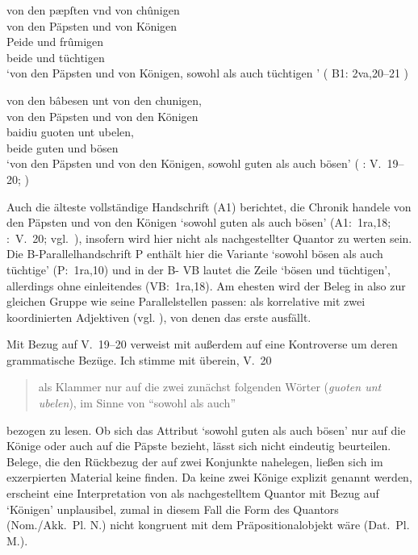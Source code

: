 \begin{exe}
\ex \begin{xlist}
	\ex \label{ex:kcexcl1}
		\gll von den pæpſten vnd von chûnigen \\
			von den Päpsten und von Königen \\
	\sn \gll Peide und frûmigen \\
			beide und tüchtigen \\
		\trans `von den Päpsten und von Königen, sowohl als auch tüchtigen
			'
			(%
				B1: 2va,20--21%
			)

	\ex \label{ex:kcexcl1_schroeder}
		\gll von den bâbesen unt von den chunigen, \\
			von den Päpsten und von den Königen \\
	\sn \gll baidiu guoten unt ubelen, \\
			beide guten und bösen \\
		\trans `von den Päpsten und von den Königen, sowohl guten als auch
			bösen'
			(%
				\KC: V.~19--20;
				\cite[79]{schroeder1895}%
			)
\end{xlist}
\end{exe}

Auch die älteste vollständige Handschrift (A1) berichtet, die Chronik handele
von den Päpsten und von den Königen  `sowohl guten
als auch bösen' (A1:~1ra,18; \KC:~V.~20; vgl.~\cite[79]{schroeder1895}),
insofern wird  hier nicht als nachgestellter Quantor zu werten
sein. Die B-\allowbreak{}Pa\-ral\-lel\-hand\-schrift P enthält hier die
Variante  `sowohl bösen als auch
tüchtige' (P:~1ra,10) und in der B- VB
lautet die Zeile  `bösen und tüchtigen', allerdings
ohne einleitendes  (VB:~1ra,18). Am ehesten wird der Beleg in
 also zur gleichen Gruppe wie seine
Parallelstellen passen:  als korrelative
 mit zwei koordinierten Adjektiven
(vgl. ), von denen das erste ausfällt.

Mit Bezug auf V.~19--20 verweist \citet[26, Fußnote 45]{weis2022} mit
\citet[55, Fußnote 87]{dickhutbielsky2015} außerdem auf eine Kontroverse um
deren grammatische Bezüge. Ich stimme mit \citet[239]{haupt2019} überein, V.~20
\blockquote{als Klammer nur auf die zwei zunächst folgenden Wörter
(\textit{guoten unt ubelen}), im Sinne von \enquote{sowohl als auch}} bezogen
zu lesen. Ob sich das Attribut 
`sowohl guten als auch bösen' nur auf die Könige oder auch auf die Päpste
bezieht, lässt sich nicht eindeutig beurteilen. Belege, die den
Rückbezug der   auf zwei Konjunkte nahelegen,
ließen sich im exzerpierten Material keine finden. Da keine zwei Könige
explizit genannt werden, erscheint eine Interpretation von  als
nachgestelltem Quantor mit Bezug auf  `Königen' unplausibel,
zumal in diesem Fall die Form des Quantors (Nom./Akk.~Pl. N.) nicht kongruent
mit dem Präpositionalobjekt wäre (Dat.~Pl. M.).

